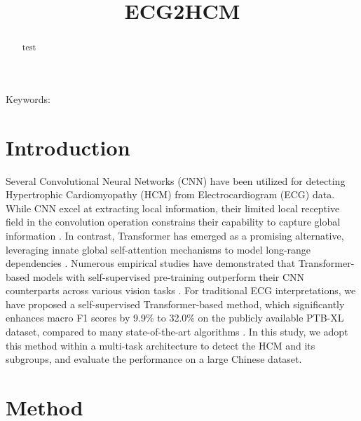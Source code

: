 \documentclass[11pt]{article}
\title{ECG2HCM}
\date{}
\theoremstyle{definition}
\begin{document}
\maketitle


\begin{abstract}
test
\end{abstract}
Keywords: 

\section{Introduction}
\label{sec:intro}


Several Convolutional Neural Networks (CNN) have been utilized for detecting Hypertrophic Cardiomyopathy (HCM) from Electrocardiogram (ECG) data. While CNN excel at extracting local information, their limited local receptive field in the convolution operation constrains their capability to capture global information \citep{song2022ctmfnet, yang2021transformer}. In contrast, Transformer has emerged as a promising alternative, leveraging innate global self-attention mechanisms to model long-range dependencies \citep{vaswani2017attention, dosovitskiy2020image}. Numerous empirical studies have demonstrated that Transformer-based models with self-supervised pre-training outperform their CNN counterparts across various vision tasks \citep{matsoukas2021time}. For traditional ECG interpretations, we have proposed a self-supervised Transformer-based method, which significantly enhances macro F1 scores by 9.9\% to 32.0\% on the publicly available PTB-XL dataset, compared to many state-of-the-art algorithms \citep{wagner2020ptb, zhou2023masked}. 
In this study, we adopt this method within a multi-task architecture to detect the HCM and its subgroups, and evaluate the performance on a large Chinese dataset. 



\section{Method}
\label{sec:method}
\end{document}
